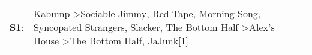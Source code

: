 \begin{supertabular}{p{0.03\textwidth}p{0.92\textwidth}}
 \textbf{S1}:  &  Kabump\textsuperscript{} \textgreater \enspace Sociable Jimmy\textsuperscript{}, \enspace Red Tape\textsuperscript{}, \enspace Morning Song\textsuperscript{}, \enspace Syncopated Strangers\textsuperscript{}, \enspace Slacker\textsuperscript{}, \enspace The Bottom Half\textsuperscript{} \textgreater \enspace Alex's House\textsuperscript{} \textgreater \enspace The Bottom Half\textsuperscript{}, \enspace JaJunk[1]\textsuperscript{}  \enspace  \\
\end{supertabular}
